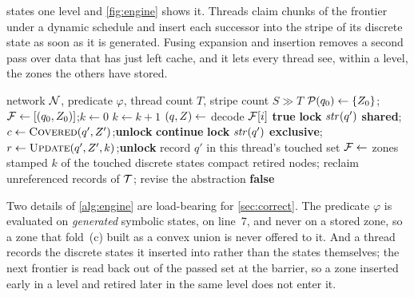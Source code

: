  states one level and \cref{fig:engine} shows it.  Threads claim
chunks of the frontier under a dynamic schedule and insert each successor into
the stripe of its discrete state as soon as it is generated.  Fusing expansion
and insertion removes a second pass over data that has just left cache, and it
lets every thread see, within a level, the zones the others have stored.

\begin{algorithm}[t]
\caption{One level of the parallel engine}
\label{alg:engine}
\begin{algorithmic}[1]
\Require network $\mathcal{N}$, predicate $\varphi$, thread count $T$, stripe count $S \gg T$
\State $\mathcal{P}(q_0) \leftarrow \{Z_0\}$;\enspace
       $\mathcal{F} \leftarrow [(q_0,Z_0)]$;\enspace $k \leftarrow 0$
\While{$\Frontier \neq \emptyset$}
  \State $k \leftarrow k+1$
   
    \State $(q,Z) \leftarrow$ decode $\mathcal{F}[i]$
       \Return \textbf{true} \EndIf
      \State \textbf{lock} $\mathit{str}(q')$ \textbf{shared};\enspace
             $c \leftarrow \textsc{Covered}(q',Z')$;\enspace \textbf{unlock}
       \textbf{continue} \EndIf
      \State \textbf{lock} $\mathit{str}(q')$ \textbf{exclusive};\enspace
             $r \leftarrow \textsc{Update}(q',Z',k)$;\enspace \textbf{unlock}
       record $q'$ in this thread's touched set \EndIf
    \EndFor
  \EndParFor
  \State $\mathcal{F} \leftarrow$ zones stamped $k$ of the touched discrete states
  \State compact retired nodes; reclaim unreferenced records of $\mathcal{T}$; revise the abstraction
\EndWhile
\Return \textbf{false}
\end{algorithmic}
\end{algorithm}

Two details of \cref{alg:engine} are load-bearing for \cref{sec:correct}.  The
predicate $\varphi$ is evaluated on \emph{generated} symbolic states, on line~7,
and never on a stored zone, so a zone that fold~(c) built as a convex union is
never offered to it.  And a thread records the discrete states it inserted into
rather than the states themselves; the next frontier is read back out of the
passed set at the barrier, so a zone inserted early in a level and retired later
in the same level does not enter it.


